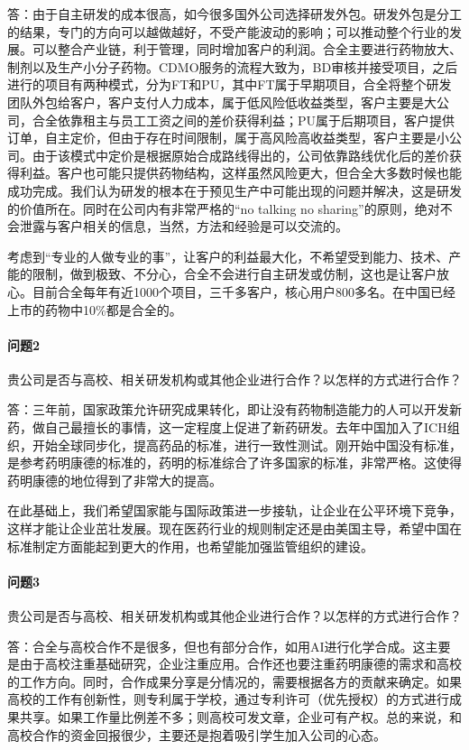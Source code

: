 \documentclass[twocolumn,openany]{ctexbook}
\begin{document}
	答：由于自主研发的成本很高，如今很多国外公司选择研发外包。研发外包是分工的结果，专门的方向可以越做越好，不受产能波动的影响；可以推动整个行业的发展。可以整合产业链，利于管理，同时增加客户的利润。合全主要进行药物放大、制剂以及生产小分子药物。CDMO服务的流程大致为，BD审核并接受项目，之后进行的项目有两种模式，分为FT和PU，其中FT属于早期项目，合全将整个研发团队外包给客户，客户支付人力成本，属于低风险低收益类型，客户主要是大公司，合全依靠租主与员工工资之间的差价获得利益；PU属于后期项目，客户提供订单，自主定价，但由于存在时间限制，属于高风险高收益类型，客户主要是小公司。由于该模式中定价是根据原始合成路线得出的，公司依靠路线优化后的差价获得利益。客户也可能只提供药物结构，这样虽然风险更大，但合全大多数时候也能成功完成。我们认为研发的根本在于预见生产中可能出现的问题并解决，这是研发的价值所在。同时在公司内有非常严格的“no talking no sharing”的原则，绝对不会泄露与客户相关的信息，当然，方法和经验是可以交流的。
	
	考虑到“专业的人做专业的事”，让客户的利益最大化，不希望受到能力、技术、产能的限制，做到极致、不分心，合全不会进行自主研发或仿制，这也是让客户放心。目前合全每年有近1000个项目，三千多客户，核心用户800多名。在中国已经上市的药物中10\%都是合全的。
	
	\paragraph{问题2}贵公司是否与高校、相关研发机构或其他企业进行合作？以怎样的方式进行合作？
	
	答：三年前，国家政策允许研究成果转化，即让没有药物制造能力的人可以开发新药，做自己最擅长的事情，这一定程度上促进了新药研发。去年中国加入了ICH组织，开始全球同步化，提高药品的标准，进行一致性测试。刚开始中国没有标准，是参考药明康德的标准的，药明的标准综合了许多国家的标准，非常严格。这使得药明康德的地位得到了非常大的提高。
	
	在此基础上，我们希望国家能与国际政策进一步接轨，让企业在公平环境下竞争，这样才能让企业茁壮发展。现在医药行业的规则制定还是由美国主导，希望中国在标准制定方面能起到更大的作用，也希望能加强监管组织的建设。
	
	\paragraph{问题3}贵公司是否与高校、相关研发机构或其他企业进行合作？以怎样的方式进行合作？
	
	答：合全与高校合作不是很多，但也有部分合作，如用AI进行化学合成。这主要是由于高校注重基础研究，企业注重应用。合作还也要注重药明康德的需求和高校的工作方向。同时，合作成果分享是分情况的，需要根据各方的贡献来确定。如果高校的工作有创新性，则专利属于学校，通过专利许可（优先授权）的方式进行成果共享。如果工作量比例差不多；则高校可发文章，企业可有产权。总的来说，和高校合作的资金回报很少，主要还是抱着吸引学生加入公司的心态。
	
\end{document}
